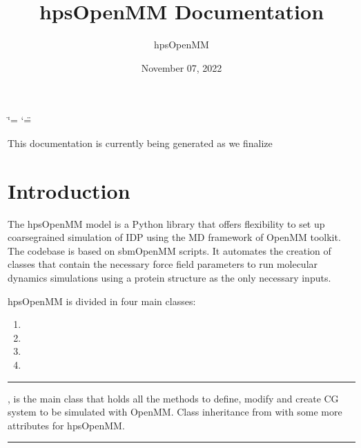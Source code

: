 \documentclass[letterpaper,10pt,english]{sphinxmanual}
\title{hpsOpenMM Documentation}
\date{November 07, 2022}
\author{hpsOpenMM}
\begin{document}
\ifdefined\shorthandoff
  \ifnum\catcode`\=\string=\active\shorthandoff{=}\fi
  \ifnum\catcode`\"=\active{}\fi
\fi

\pagestyle{empty}
\sphinxmaketitle
\pagestyle{plain}
\sphinxtableofcontents
\pagestyle{normal}
\label{\detokenize{index::doc}}


\sphinxAtStartPar
This documentation is currently being generated as we finalize

\sphinxstepscope


\chapter{Introduction}
\label{\detokenize{modules/introduction:introduction}}\label{\detokenize{modules/introduction::doc}}
\sphinxAtStartPar
The hpsOpenMM model is a Python library that offers flexibility to set up coarse\sphinxhyphen{}grained simulation of IDP using the MD framework of OpenMM toolkit.
The codebase is based on sbmOpenMM scripts.
It automates the creation of  classes that contain the necessary force field parameters to run molecular dynamics simulations using a protein structure as the only necessary inputs.

\sphinxAtStartPar
hpsOpenMM is divided in four main classes:
\begin{enumerate}
%
\item {} 
\sphinxAtStartPar
{}

\item {} 
\sphinxAtStartPar
{}

\item {} 
\sphinxAtStartPar
{}

\item {} 
\sphinxAtStartPar
{}

\end{enumerate}


\bigskip\hrule\bigskip


\sphinxAtStartPar
{}, is the main class that holds all the methods to define,
modify and create CG system to be simulated with OpenMM.
Class inheritance from  with some more attributes for hpsOpenMM.


\bigskip\hrule\bigskip
\end{document}
